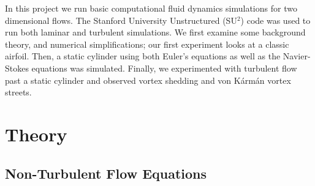 \documentclass[10pt, titlepage]{article}
\begin{document}
In this project we run basic computational fluid dynamics simulations for two dimensional flows. The Stanford University Unstructured (SU$^2$) code was used to run both laminar and turbulent simulations. We first examine some background theory, and numerical simplifications; our first experiment looks at a classic airfoil. Then, a static cylinder using both Euler's equations as well as the Navier-Stokes equations was simulated. Finally, we experimented with turbulent flow past a static cylinder and observed vortex shedding and von K\'{a}rm\'{a}n vortex streets.

\newpage

\section{Theory}
\subsection{Non-Turbulent Flow Equations}
\end{document}

